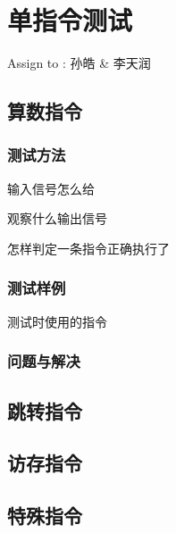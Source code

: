 \section{单指令测试}
    Assign to : 孙皓 \& 李天润

    \subsection{算数指令}

        \subsubsection{测试方法}
            输入信号怎么给

            观察什么输出信号

            怎样判定一条指令正确执行了

        \subsubsection{测试样例}
            测试时使用的指令

        \subsubsection{问题与解决}

    \subsection{跳转指令}

    \subsection{访存指令}

    \subsection{特殊指令}
